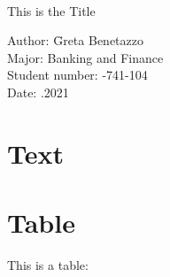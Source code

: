 \documentclass{article}
\author{
  Benetazzo, Greta\\
  \texttt{text@text.com}
  }
\begin{document}
\ \vspace{1.0cm}
\begin{center}
{\LARGE This is the Title}\\[2.5cm]



\hspace{10cm}\begin{minipage}[h]{12cm}
\begin{tabbing}
Author: \hspace{1.5cm} \= Greta Benetazzo \\
Major: \> Banking and Finance  \\
Student number: -741-104 \\
Date: .2021\\
\end{tabbing}
\end{minipage}
\end{center}


\newpage

\begin{abstract}
\blindtext
\Blindtext


\end{abstract}
\newpage

\section{Text}
\blindtext
\cite{Milgrom}
\newline
\cite{DevenowRationalHerdingInFinancialEconomics}
\Blindtext

\newpage
\section{Table}

This is a table:
\end{document}
